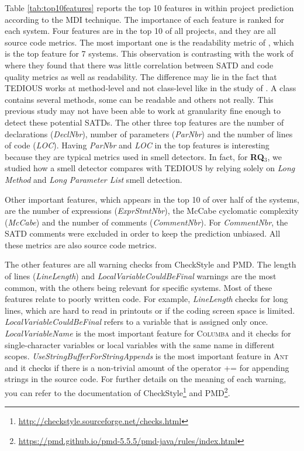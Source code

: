 Table \ref{tab:top10features} reports the top 10 features in within project prediction according to the MDI technique. The importance of each feature is ranked for each system. Four features are in the top 10 of all projects, and they are all source code metrics. The most important one is the readability metric of \citet{buse2008metric}, which is the top feature for 7 systems. This observation is contrasting with the work of \citet{BavotaR16} where they found that there was little correlation between SATD and code quality metrics as well as readability. The difference may lie in the fact that TEDIOUS works at method-level and not class-level like in the study of \citet{BavotaR16}. A class contains several methods, some can be readable and others not really. This previous study may not have been able to work at granularity fine enough to detect these potential SATDs. The other three top features are the number of declarations (\textit{DeclNbr}), number of parameters (\textit{ParNbr}) and the number of lines of code (\textit{LOC}). Having \textit{ParNbr} and \textit{LOC} in the top features is interesting because they are typical metrics used in smell detectors. In fact, for \textbf{RQ$_3$}, we studied how a smell detector compares with TEDIOUS by relying solely on \textit{Long Method} and \textit{Long Parameter List} smell detection.
	
Other important features, which appears in the top 10 of over half of the systems, are the number of expressions (\textit{ExprStmtNbr}), the McCabe cyclomatic complexity (\textit{McCabe}) and the number of comments (\textit{CommentNbr}). For \textit{CommentNbr}, the SATD comments were excluded in order to keep the prediction unbiased. All these metrics are also source code metrics.

The other features are all warning checks from CheckStyle and PMD. The length of lines (\textit{LineLength}) and \textit{LocalVariableCouldBeFinal} warnings are the most common, with the others being relevant for specific systems. Most of these features relate to poorly written code. For example, \textit{LineLength} checks for long lines, which are hard to read in printouts or if the coding screen space is limited. \textit{LocalVariableCouldBeFinal} refers to a variable that is assigned only once. \textit{LocalVariableName} is the most important feature for \textsc{Columba} and it checks for single-character variables or local variables with the same name in different scopes. \textit{UseStringBufferForStringAppends} is the most important feature in \textsc{Ant} and it checks if there is a non-trivial amount of the operator \textsc{+=} for appending strings in the source code. For further details on the meaning of each warning, you can refer to the documentation of CheckStyle\footnote{\url{http://checkstyle.sourceforge.net/checks.html}} and PMD\footnote{\url{https://pmd.github.io/pmd-5.5.5/pmd-java/rules/index.html}}.

